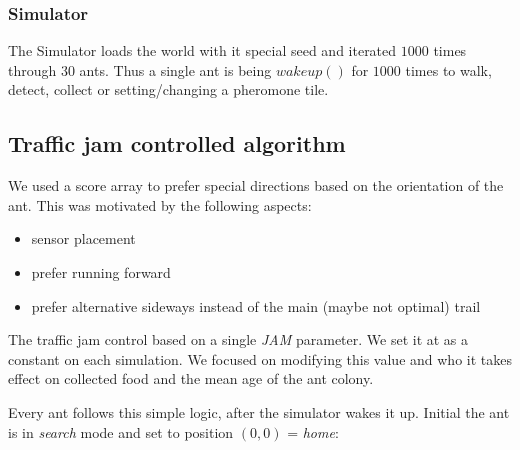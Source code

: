 \subsubsection{Simulator}\label{simulator}

The Simulator loads the world with it special seed and iterated \(1000\)
times through \(30\) ants. Thus a single ant is being \(wakeup()\) for
\(1000\) times to walk, detect, collect or setting/changing a pheromone
tile.

\subsection{Traffic jam controlled
algorithm}\label{traffic-jam-controlled-algorithm}

We used a score array to prefer special directions based on the
orientation of the ant. This was motivated by the following aspects:

\begin{itemize}
\tightlist
\item
  sensor placement
\item
  prefer running forward
\item
  prefer alternative sideways instead of the main (maybe not optimal)
  trail
\end{itemize}

The traffic jam control based on a single \emph{JAM} parameter. We set
it at as a constant on each simulation. We focused on modifying this
value and who it takes effect on collected food and the mean age of the
ant colony.

Every ant follows this simple logic, after the simulator wakes it up.
Initial the ant is in \emph{search} mode and set to position \((0,0)\) =
\emph{home}:

